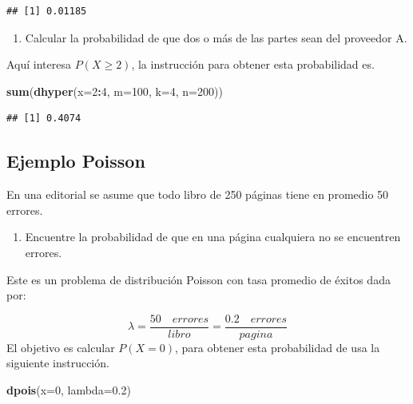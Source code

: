 \documentclass[10pt,]{krantz}
\makeatletter
\newenvironment{Shaded}{\begin{snugshade}}{\end{snugshade}}
\newcommand{\KeywordTok}[1]{\textcolor[rgb]{0.13,0.29,0.53}{\textbf{#1}}}
\newcommand{\DataTypeTok}[1]{\textcolor[rgb]{0.13,0.29,0.53}{#1}}
\newcommand{\DecValTok}[1]{\textcolor[rgb]{0.00,0.00,0.81}{#1}}
\newcommand{\FloatTok}[1]{\textcolor[rgb]{0.00,0.00,0.81}{#1}}
\newcommand{\OperatorTok}[1]{\textcolor[rgb]{0.81,0.36,0.00}{\textbf{#1}}}
\newcommand{\NormalTok}[1]{#1}
\providecommand{\tightlist}{%
  \setlength{\itemsep}{0pt}\setlength{\parskip}{0pt}}
\newenvironment{kframe}{%
\medskip{}
\setlength{\fboxsep}{.8em}
 \def\at@end@of@kframe{}%
 \ifinner\ifhmode%
  \def\at@end@of@kframe{\end{minipage}}%
  \begin{minipage}{\columnwidth}%
 \fi\fi%
 \def\FrameCommand##1{\hskip\@totalleftmargin \hskip-\fboxsep
 \colorbox{shadecolor}{##1}\hskip-\fboxsep
     \hskip-\linewidth \hskip-\@totalleftmargin \hskip\columnwidth}%
 \MakeFramed {\advance\hsize-\width
   \@totalleftmargin\z@ \linewidth\hsize
   \@setminipage}}%
 {\par\unskip\endMakeFramed%
 \at@end@of@kframe}
\renewenvironment{Shaded}{\begin{kframe}}{\end{kframe}}
\makeatother
\begin{document}
\begin{verbatim}
## [1] 0.01185
\end{verbatim}

\begin{enumerate}
\def\labelenumi{\arabic{enumi})}
\setcounter{enumi}{1}
\tightlist
\item
  Calcular la probabilidad de que dos o más de las partes sean del
  proveedor A.
\end{enumerate}

Aquí interesa \(P(X \geq 2)\), la instrucción para obtener esta
probabilidad es.

\begin{Shaded}
\begin{Highlighting}[]
\KeywordTok{sum}\NormalTok{(}\KeywordTok{dhyper}\NormalTok{(}\DataTypeTok{x=}\DecValTok{2}\OperatorTok{:}\DecValTok{4}\NormalTok{, }\DataTypeTok{m=}\DecValTok{100}\NormalTok{, }\DataTypeTok{k=}\DecValTok{4}\NormalTok{, }\DataTypeTok{n=}\DecValTok{200}\NormalTok{))}
\end{Highlighting}
\end{Shaded}

\begin{verbatim}
## [1] 0.4074
\end{verbatim}

\subsection*{Ejemplo Poisson}\label{ejemplo-poisson}


En una editorial se asume que todo libro de 250 páginas tiene en
promedio 50 errores.

\begin{enumerate}
\def\labelenumi{\arabic{enumi})}
\tightlist
\item
  Encuentre la probabilidad de que en una página cualquiera no se
  encuentren errores.
\end{enumerate}

Este es un problema de distribución Poisson con tasa promedio de éxitos
dada por:

\[\lambda=\frac{50 \quad errores}{libro}=\frac{0.2 \quad errores}{pagina}\]
El objetivo es calcular \(P(X=0)\), para obtener esta probabilidad de
usa la siguiente instrucción.

\begin{Shaded}
\begin{Highlighting}[]
\KeywordTok{dpois}\NormalTok{(}\DataTypeTok{x=}\DecValTok{0}\NormalTok{, }\DataTypeTok{lambda=}\FloatTok{0.2}\NormalTok{)}
\end{Highlighting}
\end{Shaded}
\end{document}
